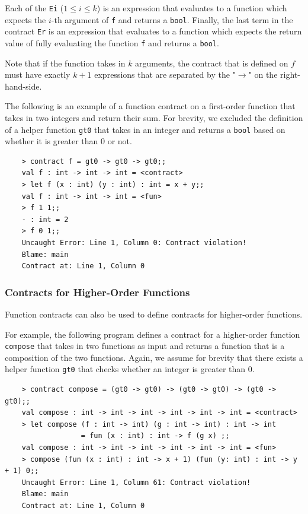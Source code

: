 \documentclass[a4paper]{article}
\begin{document}
Each of the \texttt{Ei} ($1 \leq i \leq k$) is an expression that evaluates to a function which expects the $i$-th argument of \texttt{f} and returns a \texttt{bool}.
Finally, the last term in the contract \texttt{Er} is an expression that evaluates to a function which expects the return value of fully evaluating the function \texttt{f} and returns a \texttt{bool}.

Note that if the function takes in $k$ arguments, the contract that is defined on $f$ must have exactly $k + 1$ expressions that are separated by the "$\rightarrow$" on the right-hand-side.

The following is an example of a function contract on a first-order function that takes in two integers and return their sum.
For brevity, we excluded the definition of a helper function \texttt{gt0} that takes in an integer and returns a \texttt{bool} based on whether it is greater than 0 or not.

\begin{verbatim}
    > contract f = gt0 -> gt0 -> gt0;;
    val f : int -> int -> int = <contract>
    > let f (x : int) (y : int) : int = x + y;;
    val f : int -> int -> int = <fun>
    > f 1 1;;
    - : int = 2
    > f 0 1;;
    Uncaught Error: Line 1, Column 0: Contract violation!
    Blame: main
    Contract at: Line 1, Column 0
\end{verbatim}

\subsubsection{Contracts for Higher-Order Functions}

Function contracts can also be used to define contracts for higher-order functions.

For example, the following program defines a contract for a higher-order function \texttt{compose} that takes in two functions as input and returns a function that is a composition of the two functions.
Again, we assume for brevity that there exists a helper function \texttt{gt0} that checks whether an integer is greater than 0.

\begin{verbatim}
    > contract compose = (gt0 -> gt0) -> (gt0 -> gt0) -> (gt0 -> gt0);;
    val compose : int -> int -> int -> int -> int -> int = <contract>
    > let compose (f : int -> int) (g : int -> int) : int -> int
                  = fun (x : int) : int -> f (g x) ;;
    val compose : int -> int -> int -> int -> int -> int = <fun>
    > compose (fun (x : int) : int -> x + 1) (fun (y: int) : int -> y + 1) 0;;
    Uncaught Error: Line 1, Column 61: Contract violation!
    Blame: main
    Contract at: Line 1, Column 0
\end{verbatim}
\end{document}
